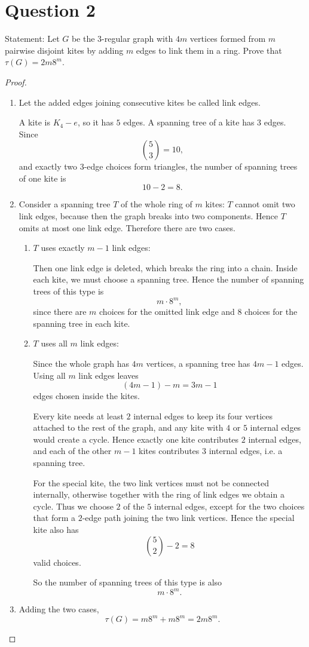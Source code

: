 \documentclass[11pt]{article}
\begin{document}
\newpage

\section*{Question 2}

Statement: {Let $G$ be the $3$-regular graph with $4m$ vertices formed from $m$ pairwise disjoint kites by adding $m$ edges to link them in a ring. Prove that $\tau(G)=2m8^m$.}

\medskip

\begin{proof}
~
\begin{enumerate}
    \item Let the added edges joining consecutive kites be called link edges.

A kite is $K_4-e$, so it has $5$ edges. A spanning tree of a kite has $3$ edges. Since
\[
\binom{5}{3}=10,
\]
and exactly two $3$-edge choices form triangles, the number of spanning trees of one kite is
\[
10-2=8.
\]

\item Consider a spanning tree $T$ of the whole ring of $m$ kites:
 $T$ cannot omit two link edges, because then the graph breaks into two components. Hence $T$ omits at most one link edge. Therefore there are two cases.

\begin{enumerate}
\item $T$ uses exactly $m-1$ link edges:

Then one link edge is deleted, which breaks the ring into a chain. Inside each kite, we must choose a spanning tree. Hence the number of spanning trees of this type is
\[
m\cdot 8^m,
\]
since there are $m$ choices for the omitted link edge and $8$ choices for the spanning tree in each kite.

\item $T$ uses all $m$ link edges:

Since the whole graph has $4m$ vertices, a spanning tree has $4m-1$ edges. Using all $m$ link edges leaves
\[
(4m-1)-m=3m-1
\]
edges chosen inside the kites.

Every kite needs at least $2$ internal edges to keep its four vertices attached to the rest of the graph, and any kite with $4$ or $5$ internal edges would create a cycle. Hence exactly one kite contributes $2$ internal edges, and each of the other $m-1$ kites contributes $3$ internal edges, i.e. a spanning tree.

For the special kite, the two link vertices must not be connected internally, otherwise together with the ring of link edges we obtain a cycle. Thus we choose $2$ of the $5$ internal edges, except for the two choices that form a $2$-edge path joining the two link vertices. Hence the special kite also has
\[
\binom{5}{2}-2=8
\]
valid choices.

So the number of spanning trees of this type is also
\[
m\cdot 8^m.
\]
\end{enumerate}

\item Adding the two cases,
\[
\tau(G)=m8^m+m8^m=2m8^m.
\]
\end{enumerate}
\end{proof}
\end{document}

